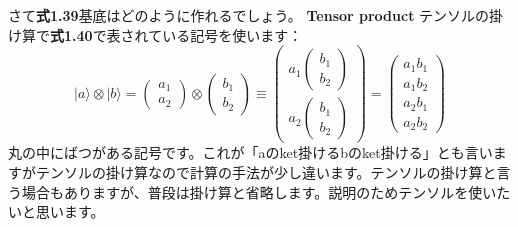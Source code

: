 さて\textbf{式1.39}基底はどのように作れるでしょう。
\textbf{Tensor product} テンソルの掛け算で\textbf{式1.40}で表されている記号を使います：
\begin{equation}
|a\rangle \otimes|b\rangle=\left(\begin{array}{l}
a_{1} \\
a_{2}
\end{array}\right) \otimes\left(\begin{array}{l}
b_{1} \\
b_{2}
\end{array}\right) \equiv\left(\begin{array}{l}
a_{1}\left(\begin{array}{l}
b_{1} \\
b_{2}
\end{array}\right) \\
a_{2}\left(\begin{array}{l}
b_{1} \\
b_{2}
\end{array}\right)
\end{array}\right)=\left(\begin{array}{l}
a_{1} b_{1} \\
a_{1} b_{2} \\
a_{2} b_{1} \\
a_{2} b_{2}
\end{array}\right)
\end{equation}
丸の中にばつがある記号です。これが「aのket掛けるbのket掛ける」とも言いますがテンソルの掛け算なので計算の手法が少し違います。テンソルの掛け算と言う場合もありますが、普段は掛け算と省略します。説明のためテンソルを使いたいと思います。

